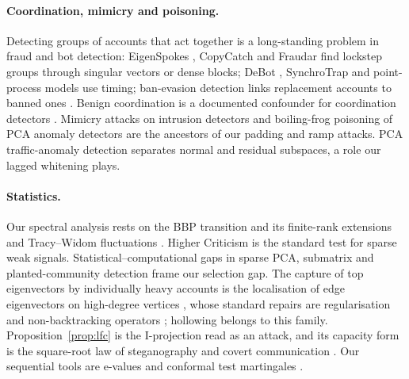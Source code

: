 \paragraph{Coordination, mimicry and poisoning.} Detecting groups of accounts that act together is a long-standing problem in fraud and bot detection: EigenSpokes \citep{prakash2010eigenspokes}, CopyCatch \citep{beutel2013copycatch} and Fraudar \citep{hooi2016fraudar} find lockstep groups through singular vectors or dense blocks; DeBot \citep{chavoshi2016debot}, SynchroTrap \citep{cao2014synchrotrap} and point-process models \citep{sharma2021identifying} use timing; ban-evasion detection links replacement accounts to banned ones \citep{niverthi2022characterizing}. Benign coordination is a documented confounder for coordination detectors \citep{vargas2020detection}. Mimicry attacks on intrusion detectors \citep{wagner2002mimicry} and boiling-frog poisoning of PCA anomaly detectors \citep{rubinstein2009antidote} are the ancestors of our padding and ramp attacks. PCA traffic-anomaly detection \citep{lakhina2004diagnosing} separates normal and residual subspaces, a role our lagged whitening plays.

\paragraph{Statistics.} Our spectral analysis rests on the BBP transition and its finite-rank extensions \citep{baik2005phase,paul2007asymptotics,benaych2011eigenvalues} and Tracy--Widom fluctuations \citep{tracy1994level}. Higher Criticism \citep{donoho2004hc} is the standard test for sparse weak signals. Statistical--computational gaps in sparse PCA, submatrix and planted-community detection \citep{berthet2013optimal,ma2015computational,hajek2015computational} frame our selection gap. The capture of top eigenvectors by individually heavy accounts is the localisation of edge eigenvectors on high-degree vertices \citep{alt2023localized,hiesmayr2023spectral}, whose standard repairs are regularisation and non-backtracking operators \citep{le2017concentration,krzakala2013spectral,saade2014spectral}; hollowing belongs to this family. Proposition~\ref{prop:lfc} is the I-projection \citep{csiszar1975idivergence} read as an attack, and its capacity form is the square-root law of steganography and covert communication \citep{ker2007capacity,bash2013limits}. Our sequential tools are e-values and conformal test martingales \citep{vovk2021evalues,vovk2021testing,vovk2021retrain,ramdas2023gametheoretic}.
